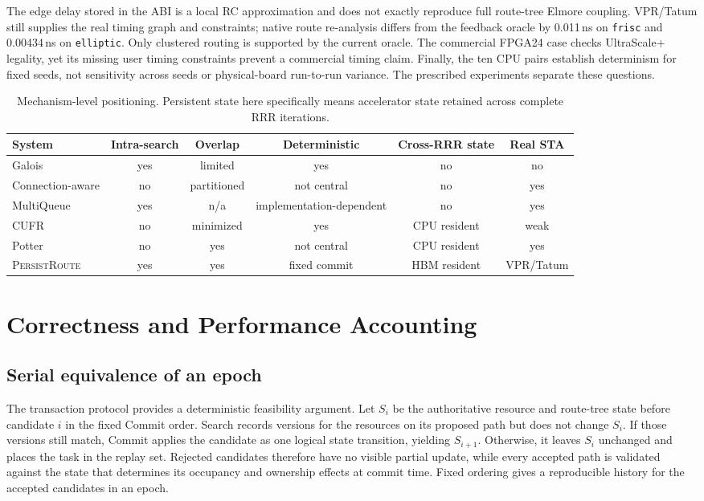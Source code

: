 \documentclass[sigconf,anonymous,review]{acmart}
\newcommand{\system}{\textsc{PersistRoute}}
\begin{document}
The edge delay stored in the ABI is a local RC approximation and does not
exactly reproduce full route-tree Elmore coupling. VPR/Tatum still supplies the
real timing graph and constraints; native route re-analysis differs from the
feedback oracle by 0.011\,ns on \texttt{frisc} and 0.00434\,ns on
\texttt{elliptic}. Only clustered routing is supported by the
current oracle. The commercial FPGA24 case checks UltraScale+ legality, yet its
missing user timing constraints prevent a commercial timing claim. Finally,
the ten CPU pairs establish determinism for fixed seeds, not sensitivity across
seeds or physical-board run-to-run variance. The prescribed experiments
separate these questions.

\begin{table}[t]
\centering
\small
\begin{tabular}{lccccc}
\toprule
System & Intra-search & Overlap & Deterministic & Cross-RRR state & Real STA \\
\midrule
Galois \cite{moctar2018galois} & yes & limited & yes & no & no \\
Connection-aware \cite{zhou2020connection} & no & partitioned & not central & no & yes \\
MultiQueue \cite{singer2024multiqueue} & yes & n/a & implementation-dependent & no & yes \\
CUFR \cite{zang2024cufr} & no & minimized & yes & CPU resident & weak \\
Potter \cite{zang2024potter} & no & yes & not central & CPU resident & yes \\
\system{} & yes & yes & fixed commit & HBM resident & VPR/Tatum \\
\bottomrule
\end{tabular}
\caption{Mechanism-level positioning. Persistent state here specifically means
accelerator state retained across complete RRR iterations.}
\label{tab:related}
\end{table}

\section{Correctness and Performance Accounting}

\subsection{Serial equivalence of an epoch}

The transaction protocol provides a deterministic feasibility argument. Let
$S_i$ be the authoritative resource and route-tree state before candidate $i$
in the fixed Commit order. Search records versions for the resources on its
proposed path but does not change $S_i$. If those versions still match, Commit
applies the candidate as one logical state transition, yielding $S_{i+1}$.
Otherwise, it leaves $S_i$ unchanged and places the task in the replay set.
Rejected candidates therefore have no visible partial update, while every
accepted path is validated against the state that determines its occupancy and
ownership effects at commit time. Fixed ordering gives a reproducible history
for the accepted candidates in an epoch.
\end{document}
